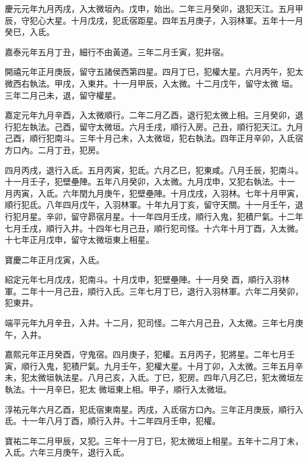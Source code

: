 \begin{pinyinscope}
 慶元元年九月丙戌，入太微垣內。戊申，始出。二年三月癸卯，退犯天江。五月甲辰，守犯心大星。十月戊戌，犯氐宿距星。四年五月庚子，入羽林軍。五年十一月癸巳，入氐。



 嘉泰元年五月丁丑，細行不由黃道。三年二月壬寅，犯井宿。



 開禧元年正月庚辰，留守五諸侯西第四星。四月丁巳，犯權大星。六月丙午，犯太微西右執法。甲戌，入東井。十一月甲辰，入太微。十二月戊午，留守太微
 垣。三年二月己未，退，留守權星。



 嘉定元年九月辛酉，入太微順行。二年二月乙酉，退行犯太微上相。三月癸卯，退行犯左執法。己酉，留守太微垣。六月壬戌，順行入房。己丑，順行犯天江。九月己酉，順行犯南斗。三年十月己未，入太微垣，犯右執法。四年正月辛卯，入氐宿方口內。二月丁丑，犯房。



 四月丙戌，退行入氐。五月丙寅，犯氐。六月乙巳，犯東咸。八月壬辰，犯南斗。十一月壬子，犯壁壘陣。五年八月癸卯，入太微。九月戊申，又犯右執法。十一
 月丙寅，入氐。六年閏九月庚午，犯壁壘陣。十月戊戌，入羽林。七年十月甲寅，順行犯氐。八年四月戊午，入羽林軍。十年九月丁亥，留守天關。十一月壬午，退行犯月星。辛卯，留守昴宿月星。十一年四月壬戌，順行入鬼，犯積尸氣。十二年七月壬戌，順行入井。十四年七月己丑，順行犯司怪。十六年十月丁酉，入太微。十七年正月戊申，留守太微垣東上相星。



 寶慶二年正月戊寅，入氐。



 紹定元年七月戊戌，犯南斗。十月戊申，犯壁壘陣。十一月癸
 酉，順行入羽林軍。二年十一月己丑，順行入氏。三年七月丁巳，退行入羽林軍。六年二月癸卯，犯東井。



 端平元年九月辛丑，入井。十二月，犯司怪。二年六月己丑，入太微。三年七月庚午，入井。



 嘉熙元年正月癸酉，守鬼宿。四月庚子，犯權。五月丙子，犯將星。二年七月壬寅，順行入鬼，犯積尸氣。九月壬午，犯權大星。十月丁卯，入太微。三年五月辛未，犯太微垣執法星。八月己亥，入氐。丁巳，犯房。四年八月乙巳，犯太微垣左執法。十一月辛巳，犯太
 微垣東上相。甲子，順行入太微垣。



 淳祐元年六月乙酉，犯氐宿東南星。丙戌，入氐宿方口內。三年正月庚辰，順行入氐。十一年八月丁酉，順行入井。十二年四月壬申，犯權。



 寶祐二年二月甲辰，又犯。三年十一月丁巳，犯太微垣上相星。五年十二月丁未，入氐。六年三月庚午，退行入氐。




\end{pinyinscope}

